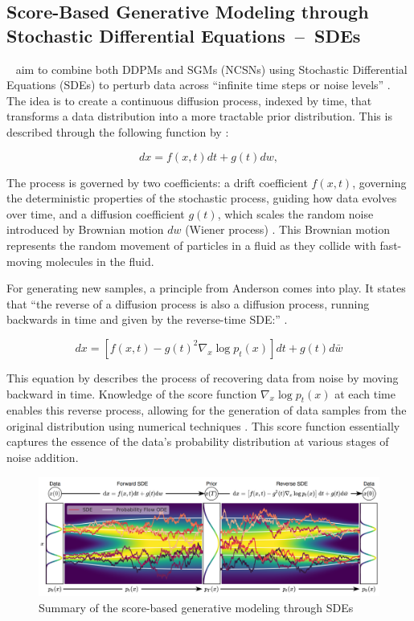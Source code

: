 \subsection{Score-Based Generative Modeling through Stochastic Differential Equations~--~SDEs}

~\citeauthor{song2020score} aim to combine both DDPMs and SGMs (NCSNs) using Stochastic Differential Equations (SDEs) to perturb data across ``infinite time steps or noise levels'' \citep{yangdiffusionSummary}. The idea is to create a continuous diffusion process, indexed by time, that transforms a data distribution into a more tractable prior distribution. This is described through the following function by \citeauthor{song2020score}:

\[ dx = f(x, t)dt + g(t)dw, \]

The process is governed by two coefficients: a drift coefficient \( f(x, t) \), governing the deterministic properties of the stochastic process, guiding how data evolves over time, and a diffusion coefficient \( g(t) \), which scales the random noise introduced by Brownian motion \( dw \) (Wiener process) \citep{song2020score}. This Brownian motion represents the random movement of particles in a fluid as they collide with fast-moving molecules in the fluid. 


For generating new samples, a  principle from Anderson \citep{anderson1982313} comes into play. It states that ``the reverse of a diffusion process is also a diffusion process, running backwards in time and given by the reverse-time SDE:\@'' \citep{song2020score}.

\[ dx = \left[ f(x, t) - g(t)^2 \nabla_x \log p_t(x) \right] dt + g(t)d\bar{w} \]

This equation by \citeauthor{song2020score} describes the process of recovering data from noise by moving backward in time. Knowledge of the score function \( \nabla_x \log p_t(x) \) at each time enables this reverse process, allowing for the generation of data samples from the original distribution using numerical techniques \citep{song2020score}. This score function essentially captures the essence of the data's probability distribution at various stages of noise addition.

\begin{figure}[ht]
  \centering
    \includegraphics[width=1\columnwidth]{figures/DiffusionModels_SDEs.png}
    \caption{Summary of the score-based generative modeling through SDEs \citep{song2020score}}\label{fig:DM_SDEs}
\end{figure}


